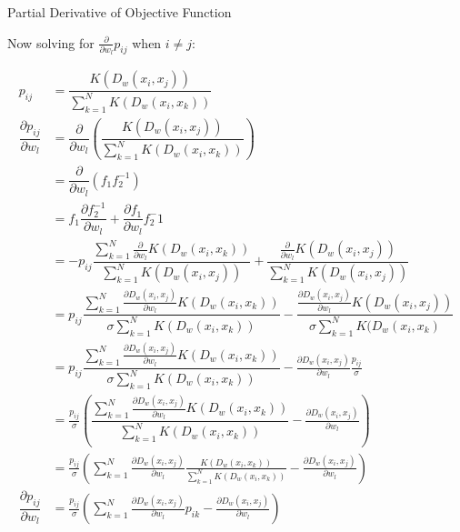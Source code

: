 \documentclass[12pt, a4paper]{article}
\begin{document}
\begin{section}{Partial Derivative of Objective Function}
    
    Now solving for $\frac{\partial}{\partial w_l} p_{ij}$ when $i \neq j$:

    \begin{align*}
        p_{ij} &= \dfrac{K(D_w(x_i, x_j))}
                        {\sum \limits_{k = 1}^N K(D_w(x_i, x_k))} \\
        \dfrac{\partial p_{ij}}{\partial w_l}
        &=  \dfrac{\partial}{\partial w_l} \left (
            \dfrac{K(D_w(x_i, x_j))}
                  {\sum \limits_{k = 1}^N K(D_w(x_i, x_k))} \right ) \\
        &=
            \dfrac{\partial}{\partial w_l} (f_1 f_2^{-1}) \\ 
        &= 
            f_1 \dfrac{\partial f_2^{-1}}{\partial w_l} + 
            \dfrac{\partial f_1}{\partial w_l} f_2^-1 \\
        &=
            - p_{ij} \dfrac{\sum \limits_{k=1}^N \frac{\partial}{\partial w_l} K(D_w(x_i, x_k))}
            {\sum \limits_{k=1}^N K(D_w(x_i, x_j))}
            + \dfrac{\frac{\partial}{\partial w_l} K(D_w(x_i, x_j))}
              {\sum \limits_{k=1}^N K(D_w(x_i, x_j))} \\
        &=
            p_{ij} \dfrac{\sum \limits_{k=1}^N \frac{\partial D_w(x_i, x_j)}{\partial w_l} K(D_w(x_i, x_k))}
            {\sigma \sum \limits_{k=1}^N K(D_w(x_i, x_k))}
            - 
            \dfrac{\frac{\partial D_w(x_i, x_j)}{\partial w_l}K(D_w(x_i, x_j))}
            {\sigma \sum \limits_{k=1}^N K(D_w(x_i, x_k)} \\
        &=
            p_{ij} \dfrac{\sum \limits_{k=1}^N \frac{\partial D_w(x_i, x_j)}{\partial w_l} K(D_w(x_i, x_k))}
            {\sigma \sum \limits_{k=1}^N K(D_w(x_i, x_k))}
            - 
            \frac{\partial D_w(x_i, x_j)}{\partial w_l} \frac{p_{ij}}{\sigma} \\
        &= \frac{p_{ij}}{\sigma}
           \left ( 
                \dfrac{\sum \limits_{k=1}^N \frac{\partial D_w(x_i, x_j)}{\partial w_l} K(D_w(x_i, x_k))}
                {\sum \limits_{k=1}^N K(D_w(x_i, x_k))}
                - 
                \frac{\partial D_w(x_i, x_j)}{\partial w_l} \right ) \\
        &= \frac{p_{ij}}{\sigma}
            \left ( 
                \sum \limits_{k=1}^N \frac{\partial D_w(x_i, x_j)}{\partial w_l}
                    \frac{K(D_w(x_i, x_k))}{\sum \limits_{k=1}^N K(D_w(x_i, x_k))}
                - 
                \frac{\partial D_w(x_i, x_j)}{\partial w_l} \right) \\
        \dfrac{\partial p_{ij}}{\partial w_l}
        &= \frac{p_{ij}}{\sigma}
            \left ( 
                \sum \limits_{k=1}^N \frac{\partial D_w(x_i, x_j)}{\partial w_l} p_{ik}
                - 
                \frac{\partial D_w(x_i, x_j)}{\partial w_l} \right) \\
    \end{align*}


\end{section}
\end{document}
